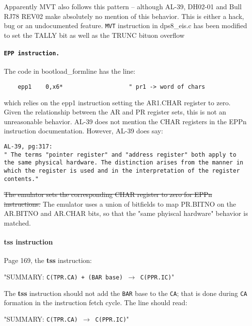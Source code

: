 \documentclass[notitlepage]{report}
\begin{document}
Apparently MVT also follows this pattern -- although AL-39, DH02-01 and Bull RJ78 REV02 make absolutely no mention of this behavior. 
This is either a hack, bug or an undocumented feature. \texttt{MVT} instruction in dps8\_eis.c has been modified to set the TALLY bit as well as the TRUNC bituon overflow


\paragraph{\texttt{EPP instruction.}}

The code in bootload\_formline has the line:

\begin{verbatim}
	epp1    0,x6*                   " pr1 -> word of chars
\end{verbatim}

which relies on the epp1 instruction setting the AR1.CHAR register to zero. Given the relationship between the AR and PR register sets, this is not an unreasonable behavior. AL-39 does not mention the CHAR registers in the EPPn instruction documentation. However, AL-39 does say:

\begin{verbatim}
AL-39, pg:317:
" The terms "pointer register" and "address register" both apply to the same physical hardware. The distinction arises from the manner in which the register is used and in the interpretation of the register contents."
\end{verbatim}

\sout{The emulator sets the corresponding CHAR register to zero for EPPn instructions.}
The emulator uses a union of bitfields to map PR.BITNO on the AR.BITNO and AR.CHAR bits, so that the "same phyiscal hardware" behavior is matched.

\paragraph{\textbf{tss} instruction}

Page 169, the \textbf{tss} instruction:

"SUMMARY: \texttt{C(TPR.CA) + (BAR base) $\rightarrow$ C(PPR.IC)}"

The \textbf{tss} instruction should not add the \texttt{BAR} base to the \texttt{CA}; that is done during \texttt{CA} formation in the instruction fetch cycle. The line should read:

"SUMMARY: \texttt{C(TPR.CA) $\rightarrow$ C(PPR.IC)}"
\end{document}
